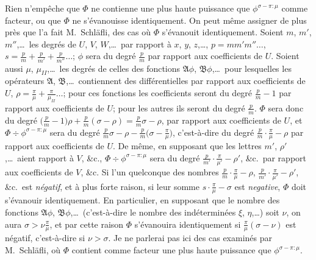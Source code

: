 \documentclass[11pt,a4paper]{article}
\theoremstyle{definition}
\begin{document}
Rien n'emp\^eche que $\Phi$ ne contienne une plus haute puissance que
$\phi^{\sigma - \pi:\mu}$ comme facteur, ou que $\Phi$ ne s'\'evanouisse
identiquement. On peut m\^eme assigner de plus pr\`es que l'a fait
M.~Schl\"afli, des cas o\`u $\Phi$ s'\'evanouit identiquement. Soient
$m$, $m'$, $m''$,\ldots\ les degr\'es de $U$, $V$, $W$,\ldots\ par rapport
\`a $x$, $y$, $z$,\ldots, $p = mm'm''\ldots$, $s = \tfrac{p}{m} + \tfrac{p}{m'} + \tfrac{p}{m''}\ldots$;
$\phi$ sera du degr\'e $\tfrac{p}{m}$ par rapport aux coefficients de $U$.
Soient aussi $\mu$, $\mu_{\scriptscriptstyle II}$,\ldots\ les degr\'es de celles
des fonctions $\mathfrak{A}\phi$, $\mathfrak{B}\phi$,\ldots\ pour lesquelles
les op\'erateurs $\mathfrak{A}$, $\mathfrak{B}$,\ldots\ contiennent des
diff\'erentielles par rapport aux coefficients de $U$,
$\rho = \tfrac{\pi}{\mu} + \tfrac{\pi}{\mu_{\scriptscriptstyle II}}\ldots$;
pour ces fonctions les coefficients seront du degr\'e $\tfrac{p}{m}-1$ par
rapport aux coefficients de $U$; pour les autres ils seront du degr\'e
$\tfrac{p}{m}$. $\Phi$ sera donc du degr\'e
$\bigl(\tfrac{p}{m}-1\bigr)\rho + \tfrac{p}{m}(\sigma - \rho)
= \tfrac{p}{m}\sigma - \rho$, par rapport aux coefficients de $U$, et
$\Phi \div \phi^{\sigma - \pi:\mu}$ sera du degr\'e
$\tfrac{p}{m}\sigma - \rho - \tfrac{p}{m}\bigl(\sigma - \tfrac{\pi}{\mu}\bigr)$,
c'est-\`a-dire du degr\'e
$\tfrac{p}{m} \cdot \tfrac{\pi}{\mu} - \rho$ par rapport aux coefficients de $U$.
De m\^eme, en supposant que les lettres $m'$, $\rho'$,\ldots\ aient rapport
\`a $V$, \&c., $\Phi \div \phi^{\sigma - \pi:\mu}$ sera du degr\'e
$\tfrac{p}{m'} \cdot \tfrac{\pi}{\mu'} - \rho'$, \&c.\ par rapport aux
coefficients de $V$, \&c. Si l'un quelconque des nombres
$\tfrac{p}{m} \cdot \tfrac{\pi}{\mu} - \rho$,
$\tfrac{p}{m'} \cdot \tfrac{\pi}{\mu'} - \rho'$, \&c.\ est
\textit{n\'egatif}, et \`a plus forte raison, si leur somme
$s \cdot \tfrac{\pi}{\mu} - \sigma$ est \textit{negative}, $\Phi$ doit
s'\'evanouir identiquement. En particulier, en supposant que le nombre des
fonctions $\mathfrak{A}\phi$, $\mathfrak{B}\phi$,\ldots\ (c'est-\`a-dire le nombre
des ind\'etermin\'ees $\xi$, $\eta$,\ldots) soit $\nu$, on aura
$\sigma > \nu\tfrac{\pi}{\mu}$, et par cette raison $\Phi$ s'\'evanouira
identiquement si $\tfrac{\pi}{\mu}(\sigma - \nu)$ est n\'egatif, c'est-\`a-dire
si $\nu > \sigma$. Je ne parlerai pas ici des cas examin\'es par
M.~Schl\"afli, o\`u $\Phi$ contient comme facteur une plus haute puissance
que $\phi^{\sigma - \pi:\mu}$.

\newpage
\end{document}
